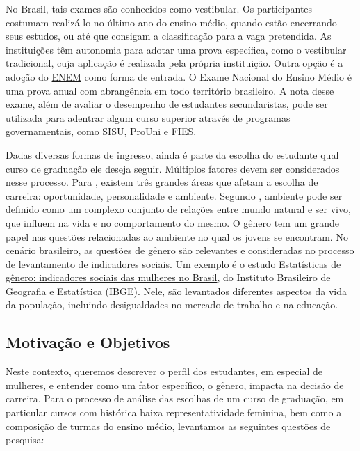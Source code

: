 No Brasil, tais exames são conhecidos como vestibular. Os participantes costumam realizá-lo no último ano do ensino médio, quando estão encerrando seus estudos, ou até que consigam a classificação para a vaga pretendida. As instituições têm autonomia para adotar uma prova específica, como o vestibular tradicional, cuja aplicação é realizada pela própria instituição. Outra opção é a adoção do \href{https://www.gov.br/inep/pt-br/areas-de-atuacao/avaliacao-e-exames-educacionais/enem}{ENEM} como forma de entrada. O Exame Nacional do Ensino Médio é uma prova anual com abrangência em todo território brasileiro. A nota desse exame, além de avaliar o desempenho de estudantes secundaristas, pode ser utilizada para adentrar algum curso superior através de programas governamentais, como SISU, ProUni e FIES.

Dadas diversas formas de ingresso, ainda é parte da escolha do estudante qual curso de graduação ele deseja seguir. Múltiplos fatores devem ser considerados nesse processo. Para \citet{Borchert2001}, existem três grandes áreas que afetam a escolha de carreira: oportunidade, personalidade e ambiente. Segundo \citet{Abbagnano2012}, ambiente pode ser definido como um complexo conjunto de relações entre mundo natural e ser vivo, que influem na vida e no comportamento do mesmo. O gênero tem um grande papel nas questões relacionadas ao ambiente no qual os jovens se encontram. No cenário brasileiro, as questões de gênero são relevantes e consideradas no processo de levantamento de indicadores sociais. Um exemplo é o estudo \href{https://biblioteca.ibge.gov.br/visualizacao/livros/liv101784_informativo.pdf}{Estatísticas de gênero: indicadores sociais das mulheres no Brasil}, do Instituto Brasileiro de Geografia e Estatística (IBGE). Nele, são levantados diferentes aspectos da vida da população, incluindo desigualdades no mercado de trabalho e na educação.

\subsection{Motivação e Objetivos}
Neste contexto, queremos descrever o perfil dos estudantes, em especial de mulheres, e entender como um fator específico, o gênero, impacta na decisão de carreira. Para o processo de análise das escolhas de um curso de graduação, em particular cursos com histórica baixa representatividade feminina, bem como a composição de turmas do ensino médio, levantamos as seguintes questões de pesquisa:

